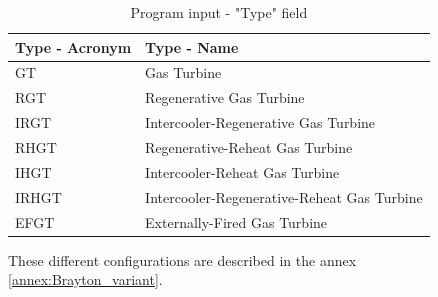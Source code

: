 \begin{longtable}[c]{ll}
\caption{Program input - "Type" field}
\label{tab:C5_inputconfig}\\
\toprule
\textbf{Type - Acronym} & \textbf{Type - Name}                   \\* \midrule
\endfirsthead
%
\endhead
%
\bottomrule
\endfoot
%
\endlastfoot
%
GT                           & Gas Turbine                                 \\
RGT                          & Regenerative Gas Turbine                    \\
IRGT                         & Intercooler-Regenerative Gas Turbine        \\
RHGT                         & Regenerative-Reheat Gas Turbine             \\
IHGT                         & Intercooler-Reheat Gas Turbine              \\
IRHGT                        & Intercooler-Regenerative-Reheat Gas Turbine \\
EFGT                         & Externally-Fired Gas Turbine                \\* \bottomrule
\end{longtable}

These different configurations are described in the annex \ref{annex:Brayton_variant}. 

